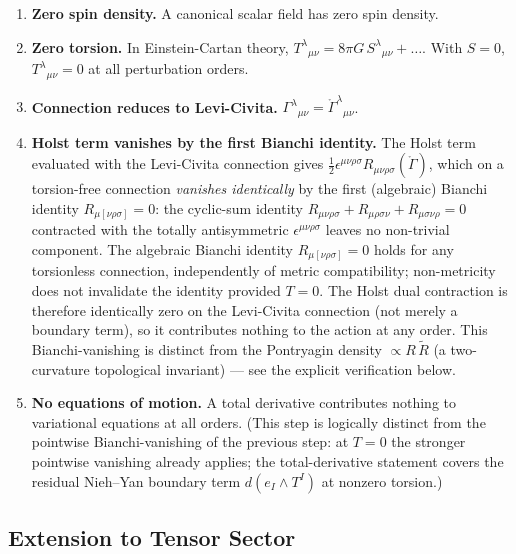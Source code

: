 \documentclass[aps,prd,twocolumn,superscriptaddress,showpacs,preprintnumbers,nofootinbib,longbibliography,floatfix]{revtex4-2}
\begin{document}
\begin{enumerate}
\item \textbf{Zero spin density.} A canonical scalar field has zero spin density.

\item \textbf{Zero torsion.} In Einstein-Cartan theory, $T^\lambda{}_{\mu\nu}
= 8\pi G\,S^\lambda{}_{\mu\nu} + \ldots$. With $S=0$, $T^\lambda{}_{\mu\nu}=0$
at all perturbation orders.

\item \textbf{Connection reduces to Levi-Civita.} $\Gamma^\lambda{}_{\mu\nu}
= \mathring{\Gamma}^\lambda{}_{\mu\nu}$.

\item \textbf{Holst term vanishes by the first Bianchi identity.}
The Holst term evaluated with
the Levi-Civita connection gives $\frac{1}{2}\epsilon^{\mu\nu\rho\sigma}
R_{\mu\nu\rho\sigma}(\mathring{\Gamma})$, which on a torsion-free
connection \emph{vanishes identically} by the first (algebraic) Bianchi identity
$R_{\mu[\nu\rho\sigma]} = 0$: the cyclic-sum identity $R_{\mu\nu\rho\sigma} +
R_{\mu\rho\sigma\nu} + R_{\mu\sigma\nu\rho} = 0$ contracted with the totally
antisymmetric $\epsilon^{\mu\nu\rho\sigma}$ leaves no non-trivial component.
The algebraic Bianchi identity $R_{\mu[\nu\rho\sigma]}=0$ holds for any
torsionless connection, independently of metric compatibility; non-metricity
does not invalidate the identity provided $T=0$.
The Holst dual contraction is therefore identically zero on the Levi-Civita
connection (not merely a boundary term), so it contributes nothing to the
action at any order. This Bianchi-vanishing is distinct from the Pontryagin
density $\propto R\,\widetilde R$ (a two-curvature topological invariant) ---
see the explicit verification below.

\item \textbf{No equations of motion.} A total derivative contributes nothing
to variational equations at all orders. (This step is logically distinct
from the pointwise Bianchi-vanishing of the previous step: at $T=0$ the
stronger pointwise vanishing already applies; the total-derivative
statement covers the residual Nieh--Yan boundary term
$d(e_I\wedge T^I)$ at nonzero torsion.)
\end{enumerate}

\subsection{Extension to Tensor Sector}
\end{document}
